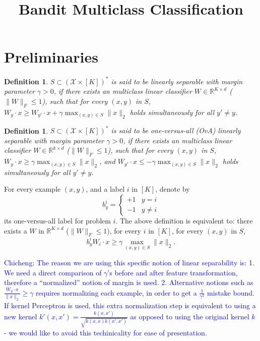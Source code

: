 \documentclass{article}
\title{Bandit Multiclass Classification}
\newcommand{\calX}{{\mathcal{X}}}
\newcommand{\field}[1]{\mathbb{#1}}
\newcommand{\fR}{\field{R}}
\newcommand{\cz}[1]{\textcolor{blue}{Chicheng: #1}}
\newtheorem{definition}[theorem]{Definition}
\begin{document}

\maketitle

\section{Preliminaries}
\begin{definition}
$S \subset (\calX \times [K])^*$ is said to be {\em linearly separable} with margin parameter $\gamma > 0$, if there exists an multiclass linear classifier $W \in \fR^{K \times d}$ ($\| W \|_F \leq 1$),
such that for every $(x,y)$ in $S$,
$W_y \cdot x \geq W_{y'} \cdot x + \gamma \max_{(x,y) \in S} \| x \|_2$ holds simultaneously for all $y' \neq y$.
\label{def:mc-margin}
\end{definition}

\begin{definition}
$S \subset (\calX \times [K])^*$ is said to be {\em one-versus-all (OvA) linearly separable} with margin parameter $\gamma > 0$, if there exists an multiclass linear classifier $W \in \fR^{k \times d}$ ($\| W \|_F \leq 1$),
such that for every $(x,y)$ in $S$,
$W_y \cdot x \geq \gamma \max_{(x,y) \in S} \| x \|_2 $,
and
$W_{y'} \cdot x \leq -\gamma \max_{(x,y) \in S} \| x \|_2$
holds simultaneously for all $y' \neq y$.
\label{def:mc-ova-margin}
\end{definition}

For every example $(x, y)$, and a label $i$ in $[K]$, denote by
\[ b_y^i = \begin{cases} +1  & y = i \\ -1 & y \neq i \end{cases} \]
its one-versus-all label for problem $i$. The above definition is equivalent to: there exists a $W$ in $\fR^{K \times d}$ ($\|W\|_F \leq 1$),
for every $i$ in $[K]$,
for every $(x, y)$ in $S$,
\[
b_y^i W_i \cdot x \geq \gamma \max_{(x,y) \in S} \| x \|_2.
\]


\cz{The reason we are using this specific notion of linear separability is:
1. We need a direct comparison of $\gamma$'s before and after feature transformation, therefore a ``normalized'' notion of margin is used.
2. Alternative notions such as $\frac{W_y \cdot x}{\| x \|_2} \geq \gamma$ requires normalizing each example, in order to get a $\frac{1}{\gamma^2}$ mistake bound. If kernel Perceptron is used, this extra normalization step is equivalent to using a new kernel $k'(x,x') = \frac{k(x,x')}{\sqrt{k(x,x) k(x',x')}}$ as opposed to using the original kernel $k$ - we would like to avoid this techinicality for ease of presentation.}
\end{document}
